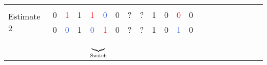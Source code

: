 \documentclass[xcolor=dvipsnames,table]{beamer}
\begin{document}
\begin{frame}[plain,t]
\begin{center}
{{\begin{tabular}{lrrrrrrrrrrrrrrrrrrrr}
&&&&&&&&&&&&&&&&&&\\[-10pt]
        \multirow{2}{*}{\textcolor{black}{Estimate 2}}   
        & \cellcolor{pink}0 & \cellcolor{pink}\textcolor{Red}{1} & \cellcolor{pink}1 & \cellcolor{pink}\textcolor{Red}{1} & \cellcolor{SkyBlue}\textcolor{RoyalBlue}{0} & \cellcolor{SkyBlue}0 & \cellcolor{SkyBlue}\textcolor{black}{?} & \cellcolor{SkyBlue}\textcolor{black}{?} & \cellcolor{SkyBlue}1 & \cellcolor{SkyBlue}0 & \cellcolor{pink}\textcolor{Red}{0} & \cellcolor{pink}0\\
        & \cellcolor{SkyBlue}0 & \cellcolor{SkyBlue}\textcolor{RoyalBlue}{0} & \cellcolor{SkyBlue}1 &  \cellcolor{SkyBlue}\textcolor{RoyalBlue}{0} & \cellcolor{pink}\textcolor{Red}{1} & \cellcolor{pink}0 & \cellcolor{pink}\textcolor{black}{?} & \cellcolor{pink}\textcolor{black}{?} & \cellcolor{pink}1 & \cellcolor{pink}0 & \cellcolor{SkyBlue}\textcolor{RoyalBlue}{1} & \cellcolor{SkyBlue}0\\[-12pt]
         &  &  &  & \multicolumn{2}{l}{$\underbrace{\strut \makebox{~\hspace{12pt}~}}_{\text{\textcolor{black}{Switch}}}$} &  &   
          & &&&\\
      \end{tabular}}}
\end{center}
\end{frame}
\end{document}
